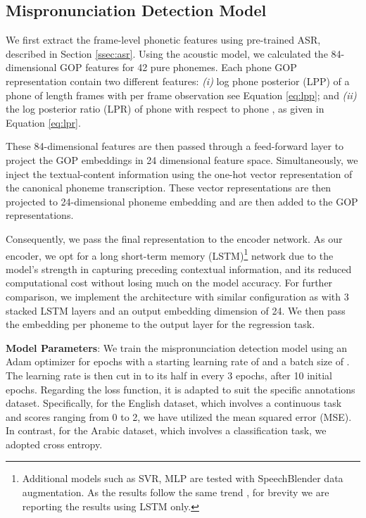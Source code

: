 \documentclass{INTERSPEECH2023}
\begin{document}
\subsection{Mispronunciation Detection Model}



We first extract the frame-level phonetic features using pre-trained ASR, described in Section \ref{ssec:asr}. Using the acoustic model, we calculated the 84-dimensional GOP features for 42 pure phonemes. 
Each phone GOP representation contain two different features: \textit{(i)} log phone posterior (LPP) \cite{transfer_} of a phone  of length  frames with per frame observation  see Equation \ref{eq:lpp}; 
and \textit{(ii)} the log posterior ratio (LPR) \cite{transfer_} of phone  with respect to phone , as given in Equation \ref{eq:lpr}.

\noindent These 84-dimensional features are then passed through a feed-forward layer to project the GOP embeddings in 24 dimensional feature space.  
Simultaneously, we inject the textual-content information using the one-hot vector representation of the canonical phoneme transcription. These vector representations are then projected to 24-dimensional phoneme embedding and are then added to the GOP representations.




\noindent Consequently, we pass the final representation to the encoder network. As our encoder, we opt for a long short-term memory (LSTM)\footnote{Additional models such as SVR\cite{speechocean}, MLP are tested with SpeechBlender data augmentation. As the results follow the same trend , for brevity we are reporting the results using LSTM only.}
network due to the model's strength in capturing preceding contextual information, and its reduced computational cost without losing much on the model accuracy. For further comparison, we implement the architecture with similar configuration as \cite{JIM} with 3 stacked LSTM layers and an output embedding dimension of 24. We then pass the embedding per phoneme to the output layer for the regression task.

\noindent\textbf{Model Parameters}: We train the mispronunciation detection model using an Adam optimizer for  epochs with a starting learning rate of  and a batch size of . The learning rate is then cut in to its half in every 3 epochs, after 10 initial epochs. 
Regarding the loss function, it is adapted to suit the specific annotations dataset. Specifically, for the English dataset, which involves a continuous task and scores ranging from 0 to 2, we have utilized the mean squared error (MSE). In contrast, for the Arabic dataset, which involves a classification task, we adopted cross entropy.
\end{document}
